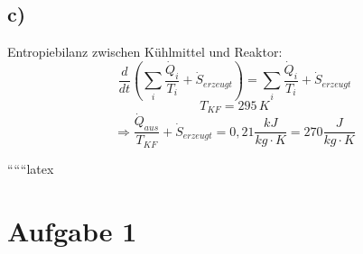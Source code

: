 

\subsection*{c)}
Entropiebilanz zwischen Kühlmittel und Reaktor:
\[
\frac{d}{dt} \left( \sum_i \frac{\dot{Q}_i}{T_i} + \dot{S}_{erzeugt} \right) = \sum_i \frac{\dot{Q}_i}{T_i} + \dot{S}_{erzeugt}
\]
\[
T_{KF} = 295 \, K
\]
\[
\Rightarrow \frac{\dot{Q}_{aus}}{T_{KF}} + \dot{S}_{erzeugt} = 0,21 \frac{kJ}{kg \cdot K} = 270 \frac{J}{kg \cdot K}
\]

``````latex


\section*{Aufgabe 1}